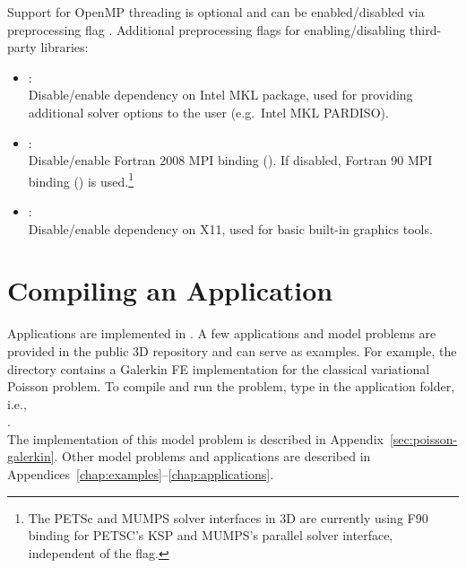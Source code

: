 Support for OpenMP threading is optional and can be enabled/disabled via preprocessing flag . Additional preprocessing flags for enabling/disabling third-party libraries:
\begin{itemize}
	\item{:\\
	Disable/enable dependency on Intel MKL package, used for providing additional solver options to the user (e.g.~Intel MKL PARDISO).
	} \item{:\\
	Disable/enable Fortran 2008 MPI binding (). If disabled, Fortran 90 MPI binding () is used.\footnote{The PETSc and MUMPS solver interfaces in \hp3D are currently using F90 binding for PETSC's KSP and MUMPS's parallel solver interface, independent of the  flag.}
	} \item{:\\
	Disable/enable dependency on X11, used for basic built-in graphics tools.}
\end{itemize}

\section{Compiling an Application}
\label{sec:application}

Applications are implemented in . A few applications and model problems are provided in the public \hp3D repository and can serve as examples. For example, the directory  contains a Galerkin FE implementation for the classical variational Poisson problem. To compile and run the problem, type  in the application folder, i.e.,\\
.\\
The implementation of this model problem is described in Appendix~\ref{sec:poisson-galerkin}. Other model problems and applications are described in Appendices~\ref{chap:examples}--\ref{chap:applications}.

%


